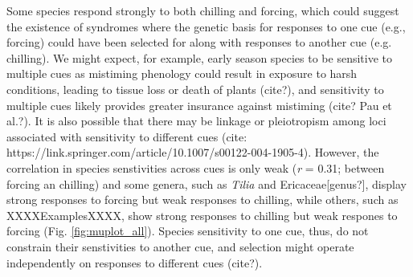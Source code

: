 \documentclass{article}\usepackage[]{graphicx}\usepackage[]{color}
\begin{document}
Some species respond strongly to both chilling and forcing, which could suggest the existence of syndromes where the genetic basis for responses to one cue (e.g., forcing) could have been selected for along with responses to another cue (e.g. chilling). We might expect, for example, early season species to be sensitive to multiple cues as mistiming phenology could result in exposure to harsh conditions, leading to tissue loss or death of plants (cite?), and sensitivity to multiple cues likely provides greater insurance against mistiming (cite? Pau et al.?). It is also possible that there may be linkage or pleiotropism among loci associated with sensitivity to different cues (cite: https://link.springer.com/article/10.1007/s00122-004-1905-4). However, the correlation in species senstivities across cues is only weak (\emph{r} = 0.31; between forcing an chilling) and some genera, such as \emph{Tilia} and Ericaceae[genus?], display strong responses to forcing but weak responses to chilling, while others, such as XXXXExamplesXXXX, show strong responses to chilling but weak respones to forcing (Fig. \ref{fig:muplot_all}). Species sensitivity to one cue, thus, do not constrain their senstivities to another cue, and selection might operate independently on responses to different cues (cite?).\\
\end{document}

